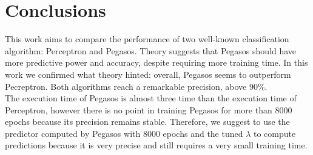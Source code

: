 \documentclass{article}
\begin{document}
\section{Conclusions} \label{Conclusions}
This work aims to compare the performance of two well-known classification algorithm: Perceptron and Pegasos. 
Theory suggests that Pegasos should have more predictive power and accuracy, despite requiring more training time. In this work we confirmed what theory hinted: overall, Pegasos seems to outperform Pecreptron. Both algorithms reach a remarkable precision, above 90\%.  \\
The execution time of Pegasos is almost three time than the execution time of Perceptron, however there is no point in training Pegasos for more than 8000 epochs because its precision remains stable. Therefore, we suggest to use the predictor computed by Pegasos with 8000 epochs and the tuned $\lambda$ to compute predictions because it is very precise and still requires a very small training time. 
\end{document}
